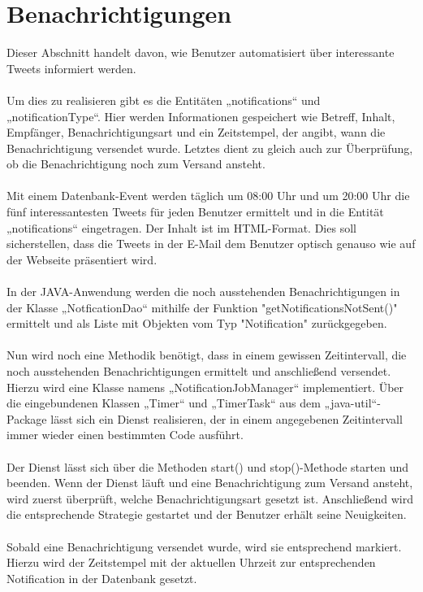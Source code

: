\section{Benachrichtigungen}

Dieser Abschnitt handelt davon, wie Benutzer automatisiert über interessante Tweets informiert werden.
\\\\
Um dies zu realisieren gibt es die Entitäten „notifications“ und „notificationType“. Hier werden Informationen gespeichert wie Betreff, Inhalt, Empfänger, Benachrichtigungsart und ein Zeitstempel, der angibt, wann die Benachrichtigung versendet wurde. Letztes dient zu gleich auch zur Überprüfung, ob die Benachrichtigung noch zum Versand ansteht.
\\\\
Mit einem Datenbank-Event werden täglich um 08:00 Uhr und um 20:00 Uhr die fünf interessantesten Tweets für jeden Benutzer ermittelt und in die Entität „notifications“ eingetragen. Der Inhalt ist im \acs{HTML}-Format. Dies soll sicherstellen, dass die Tweets in der E-Mail dem Benutzer optisch genauso wie auf der Webseite präsentiert wird.
\\\\
In der JAVA-Anwendung werden die noch ausstehenden Benachrichtigungen in der Klasse „NotficationDao“ mithilfe der Funktion "getNotificationsNotSent()" ermittelt und als Liste mit Objekten vom Typ "Notification" zurückgegeben.
\\\\
Nun wird noch eine Methodik benötigt, dass in einem gewissen Zeitintervall, die noch ausstehenden Benachrichtigungen ermittelt und anschließend versendet. Hierzu wird eine Klasse namens „NotificationJobManager“ implementiert. Über die eingebundenen Klassen „Timer“ und „TimerTask“ aus dem „java-util“-Package lässt sich ein Dienst realisieren, der in einem angegebenen Zeitintervall immer wieder einen bestimmten Code ausführt.
\\\\
Der Dienst lässt sich über die Methoden start() und stop()-Methode starten und beenden. Wenn der Dienst läuft und eine Benachrichtigung zum Versand ansteht, wird zuerst überprüft, welche Benachrichtigungsart gesetzt ist. Anschließend wird die entsprechende Strategie gestartet und der Benutzer erhält seine Neuigkeiten.
\\\\
Sobald eine Benachrichtigung versendet wurde, wird sie entsprechend markiert. Hierzu wird der Zeitstempel mit der aktuellen Uhrzeit zur entsprechenden Notification in der Datenbank gesetzt.

